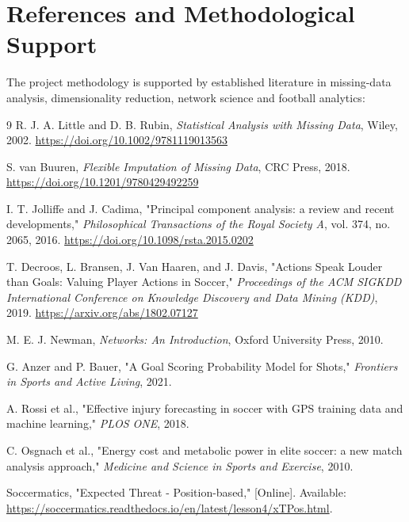 \documentclass[12pt,a4paper]{article}
\begin{document}
\section{References and Methodological Support}
The project methodology is supported by established literature in missing-data analysis, dimensionality reduction, network science and football analytics:
\begin{thebibliography}{9}
R. J. A. Little and D. B. Rubin,
\textit{Statistical Analysis with Missing Data},
Wiley, 2002.
\url{https://doi.org/10.1002/9781119013563}

S. van Buuren,
\textit{Flexible Imputation of Missing Data},
CRC Press, 2018.
\url{https://doi.org/10.1201/9780429492259}

I. T. Jolliffe and J. Cadima,
"Principal component analysis: a review and recent developments,"
\textit{Philosophical Transactions of the Royal Society A}, vol. 374, no. 2065, 2016.
\url{https://doi.org/10.1098/rsta.2015.0202}

T. Decroos, L. Bransen, J. Van Haaren, and J. Davis,
"Actions Speak Louder than Goals: Valuing Player Actions in Soccer,"
\textit{Proceedings of the ACM SIGKDD International Conference on Knowledge Discovery and Data Mining (KDD)}, 2019.
\url{https://arxiv.org/abs/1802.07127}

M. E. J. Newman,
\textit{Networks: An Introduction},
Oxford University Press, 2010.

G. Anzer and P. Bauer,
"A Goal Scoring Probability Model for Shots,"
\textit{Frontiers in Sports and Active Living}, 2021.

A. Rossi et al.,
"Effective injury forecasting in soccer with GPS training data and machine learning,"
\textit{PLOS ONE}, 2018.

C. Osgnach et al.,
"Energy cost and metabolic power in elite soccer: a new match analysis approach,"
\textit{Medicine and Science in Sports and Exercise}, 2010.

Soccermatics,
"Expected Threat - Position-based,"
[Online]. Available: \url{https://soccermatics.readthedocs.io/en/latest/lesson4/xTPos.html}.

\end{thebibliography}
\end{document}
